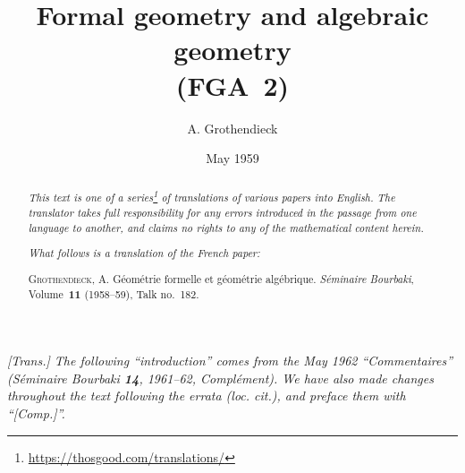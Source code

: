 \documentclass{article}
\title{Formal geometry and algebraic geometry\\(FGA~2)}
\author{A. Grothendieck}
\date{May 1959}
\theoremstyle{plain}
\theoremstyle{definition}
\begin{document}
\maketitle
\thispagestyle{fancy}

\renewcommand{\abstractname}{Translator's note.}

\begin{abstract}
  \renewcommand*{\thefootnote}{\fnsymbol{footnote}}
  \emph{This text is one of a series\footnote{\url{https://thosgood.com/translations/}} of translations of various papers into English.}
  \emph{The translator takes full responsibility for any errors introduced in the passage from one language to another, and claims no rights to any of the mathematical content herein.}

  \medskip
  
  \emph{What follows is a translation of the French paper:}

  \medskip\noindent
  \textsc{Grothendieck, A.}
  G\'{e}om\'{e}trie formelle et g\'{e}om\'{e}trie alg\'{e}brique.
  \emph{S\'{e}minaire Bourbaki}, Volume~\textbf{11} (1958--59), Talk no.~182.
\end{abstract}

\setcounter{footnote}{0}

\tableofcontents



\section*{}

\emph{[Trans.] The following ``introduction'' comes from the May 1962 ``Commentaires'' (\emph{S\'{e}minaire Bourbaki} \textbf{14}, 1961--62, Compl\'{e}ment). We have also made changes throughout the text following the errata (loc. cit.), and preface them with ``[Comp.]''.}
\end{document}
